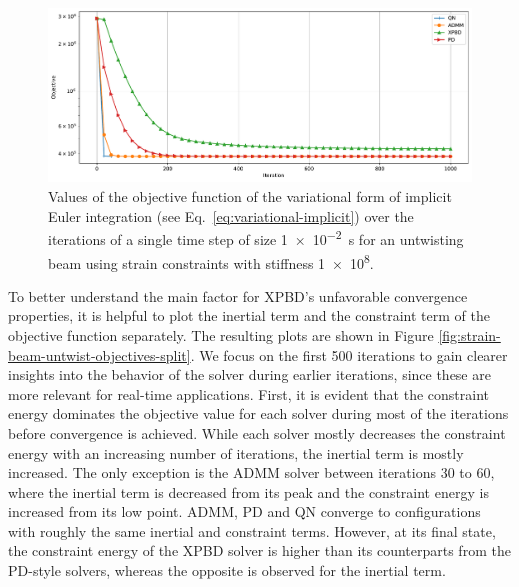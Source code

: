 \begin{figure}[h]
    \includegraphics[width=\textwidth]{figures/strain_beam_untwist_objectives.pdf}
    \caption{Values of the objective function of the variational form of implicit Euler integration (see Eq.\ \ref{eq:variational-implicit}) over the iterations of a single time 
        step of size \SI{1e-2}{\second} for an untwisting beam using strain constraints with stiffness \num{1e8}.}
    \label{fig:strain-beam-untwist-objectives}
\end{figure}


To better understand the main factor for XPBD's unfavorable convergence properties, it is helpful to plot the inertial term and the constraint term of the objective 
function separately. The resulting plots are shown in Figure \ref{fig:strain-beam-untwist-objectives-split}. 
We focus on the first 500 iterations to gain clearer insights into the behavior of the solver during earlier iterations, since these are more relevant for 
real-time applications. First, it is evident that the constraint energy dominates the objective value for each solver during most of the iterations before 
convergence is achieved. While each solver mostly decreases the constraint energy with an increasing number of iterations, the inertial term is mostly increased. 
The only exception is the ADMM solver between iterations 30 to 60, where the inertial term is decreased from its peak and the constraint energy is increased from its 
low point. ADMM, PD and QN converge to configurations with roughly the same inertial and constraint terms. However, at its final state, the constraint 
energy of the XPBD solver is higher than its counterparts from the PD-style solvers, whereas the opposite is observed for the inertial term. 

